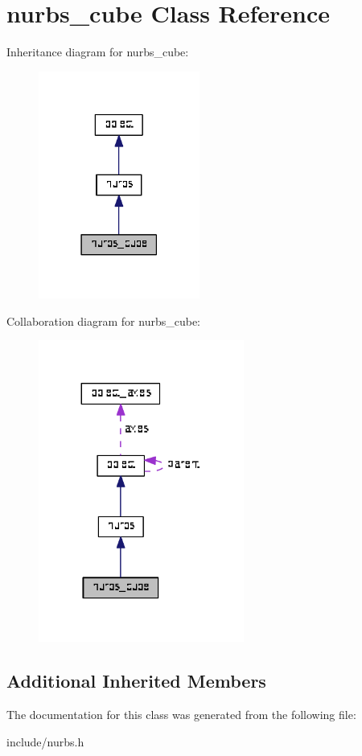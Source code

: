 \hypertarget{classnurbs__cube}{}\section{nurbs\+\_\+cube Class Reference}
\label{classnurbs__cube}


Inheritance diagram for nurbs\+\_\+cube\+:\nopagebreak
\begin{figure}[H]
\begin{center}
\leavevmode
\includegraphics[width=150pt]{classnurbs__cube__inherit__graph}
\end{center}
\end{figure}


Collaboration diagram for nurbs\+\_\+cube\+:\nopagebreak
\begin{figure}[H]
\begin{center}
\leavevmode
\includegraphics[width=191pt]{classnurbs__cube__coll__graph}
\end{center}
\end{figure}
\subsection*{Additional Inherited Members}


The documentation for this class was generated from the following file\+:\begin{DoxyCompactItemize}
\item 
include/nurbs.\+h\end{DoxyCompactItemize}
